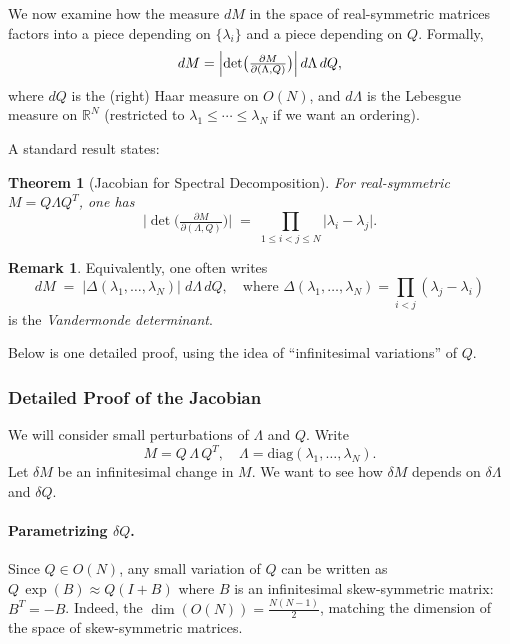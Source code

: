 \documentclass[letterpaper,11pt,oneside,reqno]{article}
\numberwithin{equation}{section}
\newtheorem{theorem}[proposition]{Theorem}
\theoremstyle{definition}
\newtheorem{remark}[proposition]{Remark}
\begin{document}
We now examine how the measure \(dM\) in the space of real-symmetric matrices factors into a piece depending on \(\{\lambda_i\}\) and a piece depending on \(Q\).  Formally,
\[
  dM
  = \Bigl|\det\bigl(\tfrac{\partial M}{\partial(\Lambda,Q)}\bigr)\Bigr|
    \,d\Lambda\,dQ,
\]
where \(dQ\) is the (right) Haar measure on \(O(N)\), and \(d\Lambda\) is the Lebesgue measure on \(\mathbb{R}^N\) (restricted to \(\lambda_1\le \cdots\le \lambda_N\) if we want an ordering).

A standard result states:

\begin{theorem}[Jacobian for Spectral Decomposition]
\label{thm:Jacobian-GOE}
For real-symmetric \(M=Q\Lambda Q^T\), one has
\[
  \bigl|\det\bigl(\tfrac{\partial M}{\partial(\Lambda,Q)}\bigr)\bigr|
  \;=\;
  \prod_{1\le i<j\le N}
  \bigl|\lambda_i - \lambda_j\bigr|.
\]
\end{theorem}

\begin{remark}
Equivalently, one often writes
\[
  dM
  \;=\;
  \bigl|\Delta(\lambda_1,\dots,\lambda_N)\bigr|\;
  d\Lambda\,dQ,
  \quad\text{where }
  \Delta(\lambda_1,\dots,\lambda_N)
  = \prod_{i<j}(\lambda_j-\lambda_i)
\]
is the \emph{Vandermonde determinant}.
\end{remark}

Below is one detailed proof, using the idea of “infinitesimal variations” of \(Q\).

\subsubsection*{Detailed Proof of the Jacobian}

We will consider small perturbations of \(\Lambda\) and \(Q\).  Write
\[
  M = Q\,\Lambda\,Q^T,
  \quad
  \Lambda = \mathrm{diag}(\lambda_1,\dots,\lambda_N).
\]
Let \(\delta M\) be an infinitesimal change in \(M\). We want to see how \(\delta M\) depends on \(\delta\Lambda\) and \(\delta Q\).

\paragraph{Parametrizing \(\delta Q\).}
Since \(Q\in O(N)\), any small variation of \(Q\) can be written as \(Q\,\exp(B)\approx Q(I+B)\) where \(B\) is an infinitesimal skew-symmetric matrix: \(B^T=-B\). Indeed, the \(\dim(O(N)) = \tfrac{N(N-1)}{2}\), matching the dimension of the space of skew-symmetric matrices.
\end{document}
